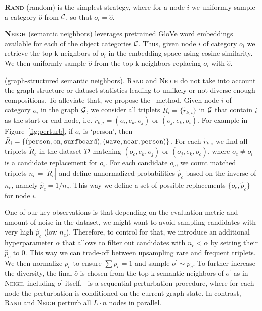 \textbf{\textsc{Rand}} (random) is the simplest strategy, where for a node $i$ we uniformly sample a category $\hat{o}$ from $\cal C$, so that $o_i=\hat{o}$.

\textsc{\textbf{Neigh}} (semantic neighbors) leverages pretrained GloVe word embeddings~\citep{pennington2014glove} available for each of the object categories $\cal C$. Thus, given node $i$ of category $o_i$ we retrieve the top-k neighbors of $o_i$ in the embedding space using cosine similarity. We then uniformly sample $\hat{o}$ from the top-k neighbors replacing $o_i$ with $\hat{o}$.

\textsc{\textbf{\structn}} (graph-structured semantic neighbors). \textsc{Rand} and \textsc{Neigh} do not take into account the graph structure or dataset statistics leading to unlikely or not diverse enough compositions. To alleviate that, we propose the \structn~method. Given node $i$ of category $o_i$ in the graph $\cal G$, we consider all triplets $\tilde{R}_i=\{\tilde{r}_{k,i}\}$ in $\cal G$ that contain $i$ as the start or end node, i.e. $\tilde{r}_{k,i}=(o_i, e_k, o_j) \text{ or } (o_j, e_k, o_i)$. 
For example in Figure~\ref{fig:perturb}, if $o_i$ is `person', then $\tilde{R}_i=\{ (\text{\texttt{person}},\text{\texttt{on}},\text{\texttt{surfboard}}), (\text{\texttt{wave}},\text{\texttt{near}},\text{\texttt{person}})\}$.
For each $\tilde{r}_{k,i}$ we find all triplets $\tilde{R}_c$ in the dataset $\cal D$ matching $(o_c, e_k, o_j)$ or $(o_j, e_k, o_c)$, where $o_c \neq o_i$ is a candidate replacement for $o_i$.
For each candidate $o_c$, we count matched triplets $n_c=|\tilde{R}_c|$ and define unnormalized probabilities $\hat{p}_c$ based on the inverse of $n_c$, namely $\hat{p}_c=1/n_c$.
This way we define a set of possible replacements $\{o_c, \hat{p}_c \}$ for node $i$. 

One of our key observations is that depending on the evaluation metric and amount of noise in the dataset, we might want to avoid sampling candidates with very high $\hat{p}_c$ (low $n_c$).
Therefore, to control for that, we introduce an additional hyperparameter $\alpha$ that allows to filter out candidates with $n_c < \alpha$ by setting their $\hat{p}_c$ to 0. 
This way we can trade-off between upsampling rare and frequent triplets.
We then normalize $p_c$ to ensure $\sum p_c = 1$ and sample $o^\prime \sim p_c$. To further increase the diversity, the final $\hat{o}$ is chosen from the top-k semantic neighbors of $o^\prime$ as in \textsc{Neigh}, including $o^\prime$ itself.
\structn~is a sequential perturbation procedure, where for each node the perturbation is conditioned on the current graph state. In contrast, \textsc{Rand} and \textsc{Neigh} perturb all $L\cdot n$ nodes in parallel.

